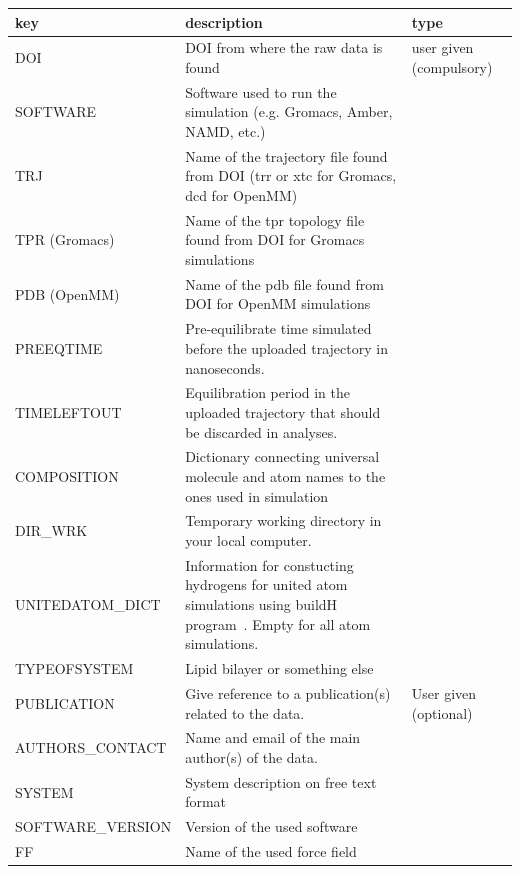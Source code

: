 \documentclass[fleqn,10pt]{wlscirep}
\begin{document}
\begin{table}[]
    \centering
    \begin{tabular}{  p{3.5cm}  p{9.5cm}  p{4.0cm} }
    \toprule
    key & description & type  \\
    \midrule
    DOI & DOI from where the raw data is found & user given (compulsory) \\
    SOFTWARE & Software used to run the simulation (e.g. Gromacs, Amber, NAMD, etc.) & \\
    TRJ & Name of the trajectory file found from DOI (trr or xtc for Gromacs, dcd for OpenMM) & \\
    TPR (Gromacs) & Name of the tpr topology file found from DOI for Gromacs simulations & \\
    PDB (OpenMM) & Name of the pdb file found from DOI for OpenMM simulations & \\
    PREEQTIME & Pre-equilibrate time simulated before the uploaded trajectory in nanoseconds. 
    & \\
    TIMELEFTOUT & Equilibration period in the uploaded trajectory that should be discarded in analyses. 
    & \\
    COMPOSITION & Dictionary connecting universal molecule and atom names to the ones used in simulation & \\
    DIR\_WRK & Temporary working directory in your local computer. \\
    UNITEDATOM\_DICT & Information for constucting hydrogens for united atom simulations using buildH program~\cite{santuz21}. Empty for all atom simulations. & \\
    TYPEOFSYSTEM & Lipid bilayer or something else & \\
    \hline
    PUBLICATION & Give reference to a publication(s) related to the data. & User given (optional)\\
    AUTHORS\_CONTACT & Name and email of the main author(s) of the data. & \\
    SYSTEM & System description on free text format & \\
    SOFTWARE\_VERSION & Version of the used software & \\
    FF & Name of the used force field & \\

\end{tabular}
\end{table}
\end{document}
